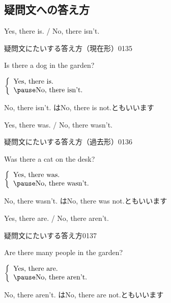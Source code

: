 \documentclass[aspectratio=169,xcolor={dvipsnames,table}]{beamer}
\newcommand{\myaudio}[1]{\href{#1}{\faVolumeUp}}
\begin{document}
\subsection{疑問文への答え方}
 \begin{frame}[plain]{Yes, there is. / No, there isn't.}
 \Large

疑問文にたいする答え方（現在形）\hfill{\tiny 0135}\,{\scriptsize \myaudio{./audio/001_there_is_09.mp3}}
\vspace{10pt}

\pause

Is there a dog in the garden?

\pause

$\left\{\begin{array}{l}
	 \text{Yes, there is.}\\\pause
         \text{No, there isn't.}
	\end{array}\right.$

\pause

\mbox{}\hfill{}{\small No, there isn't. はNo, there is not.ともいいます}
\end{frame}
 \begin{frame}[plain]{Yes, there was. / No, there wasn't.}
 \Large

疑問文にたいする答え方（過去形）\hfill{\tiny 0136}\,{\scriptsize \myaudio{./audio/001_there_is_10.mp3}}
\vspace{10pt}

\pause
Was there a cat on the desk?

\pause

$\left\{\begin{array}{l}
	 \text{Yes, there was.}\\\pause
         \text{No, there wasn't.}
	\end{array}\right.$

\pause

\mbox{}\hfill{}{\small No, there wasn't. はNo, there was not.ともいいます}
\end{frame}
 \begin{frame}[plain]{Yes, there are. / No, there aren't.}
 \Large

疑問文にたいする答え方\hfill{\tiny 0137}\,{\scriptsize \myaudio{./audio/001_there_is_11.mp3}}
\vspace{10pt}

\pause

Are there many people in the garden?

\pause 

$\left\{\begin{array}{l}
	 \text{Yes, there are.}\\\pause
         \text{No, there aren't.}
	\end{array}\right.$

\pause

\mbox{}\hfill{}{\small No, there aren't. はNo, there are not.ともいいます}
\end{frame}
\end{document}
